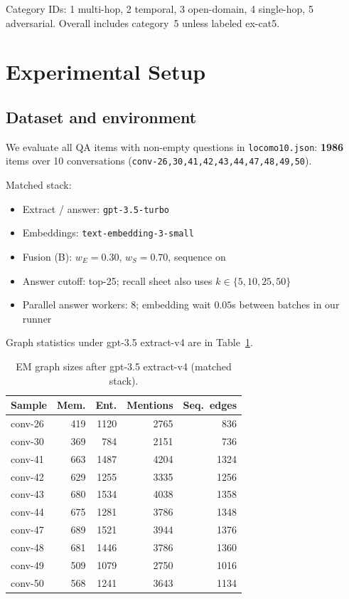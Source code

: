 \documentclass[11pt]{article}
\begin{document}
Category IDs: 1 multi-hop, 2 temporal, 3 open-domain, 4 single-hop, 5 adversarial.
Overall includes category~5 unless labeled ex-cat5.

\section{Experimental Setup}
\label{sec:setup}

\subsection{Dataset and environment}

We evaluate all QA items with non-empty questions in \texttt{locomo10.json}: \textbf{1986} items over 10 conversations
(\texttt{conv-26,30,41,42,43,44,47,48,49,50}).

Matched stack:
\begin{itemize}[leftmargin=*,itemsep=1pt]
  \item Extract / answer: \texttt{gpt-3.5-turbo}
  \item Embeddings: \texttt{text-embedding-3-small}
  \item Fusion (B): $w_E{=}0.30$, $w_S{=}0.70$, sequence on
  \item Answer cutoff: top-25; recall sheet also uses $k\in\{5,10,25,50\}$
  \item Parallel answer workers: 8; embedding wait $0.05$s between batches in our runner
\end{itemize}

Graph statistics under gpt-3.5 extract-v4 are in Table~\ref{tab:graphs}.

\begin{table}[t]
\centering
\small
\caption{EM graph sizes after gpt-3.5 extract-v4 (matched stack).}
\label{tab:graphs}
\begin{tabular}{lrrrr}
\toprule
Sample & Mem. & Ent. & Mentions & Seq.\ edges \\
\midrule
conv-26 & 419 & 1120 & 2765 & 836 \\
conv-30 & 369 & 784 & 2151 & 736 \\
conv-41 & 663 & 1487 & 4204 & 1324 \\
conv-42 & 629 & 1255 & 3335 & 1256 \\
conv-43 & 680 & 1534 & 4038 & 1358 \\
conv-44 & 675 & 1281 & 3786 & 1348 \\
conv-47 & 689 & 1521 & 3944 & 1376 \\
conv-48 & 681 & 1446 & 3786 & 1360 \\
conv-49 & 509 & 1079 & 2750 & 1016 \\
conv-50 & 568 & 1241 & 3643 & 1134 \\
\bottomrule
\end{tabular}
\end{table}
\end{document}
